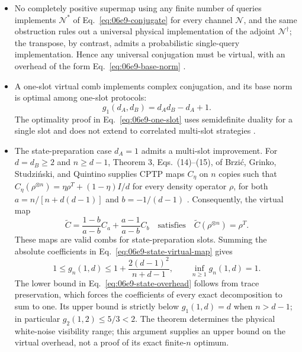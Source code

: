\begin{itemize}
  \item No completely positive supermap using any finite number of queries
  implements $\mathcal N^{*}$ of Eq.~\eqref{eq:06e9-conjugate} for every
  channel $\mathcal N$, and the same obstruction rules out a universal
  physical implementation of the adjoint $\mathcal N^{\dagger}$; the
  transpose, by contrast, admits a probabilistic single-query
  implementation.  Hence any universal conjugation must be virtual, with an
  overhead of the form Eq.~\eqref{eq:06e9-base-norm}
  .

  \item A one-slot virtual comb implements complex conjugation, and its
  base norm is optimal among one-slot protocols:
  \begin{equation}
    g_1(d_A,d_B)=d_Ad_B-d_A+1.
    \label{eq:06e9-one-slot}
  \end{equation}
  The optimality proof in Eq.~\eqref{eq:06e9-one-slot} uses semidefinite
  duality for a single slot and does not extend to correlated multi-slot
  strategies .

  \item The state-preparation case $d_A=1$ admits a multi-slot improvement.
For $d=d_B\geq2$ and $n\geq d-1$, Theorem 3, Eqs.~(14)--(15), of
Brzi\'c, Grinko, Studzi\'nski, and Quintino supplies CPTP maps
$C_\eta$ on $n$ copies such that
$C_\eta(\rho^{\otimes n})=\eta\rho^T+(1-\eta)I/d$ for every density
operator $\rho$, for both $a=n/[n+d(d-1)]$ and $b=-1/(d-1)$
.
Consequently, the virtual map
\begin{equation}
  \widetilde C=\frac{1-b}{a-b}C_a+\frac{a-1}{a-b}C_b
  \quad\text{satisfies}\quad
  \widetilde C(\rho^{\otimes n})=\rho^T.
  \label{eq:06e9-state-virtual-map}
\end{equation}
These maps are valid combs for state-preparation slots. Summing the absolute
coefficients in Eq.~\eqref{eq:06e9-state-virtual-map} gives
\begin{equation}
  1\leq g_n(1,d)\leq1+\frac{2(d-1)^2}{n+d-1},
  \qquad \inf_{n\geq1}g_n(1,d)=1.
  \label{eq:06e9-state-overhead}
\end{equation}
The lower bound in Eq.~\eqref{eq:06e9-state-overhead} follows from trace
preservation, which forces the coefficients of every exact decomposition
to sum to one. Its upper bound is strictly below $g_1(1,d)=d$ when
$n>d-1$; in particular $g_2(1,2)\leq5/3<2$.
The theorem determines the physical white-noise visibility range; this
argument supplies an upper bound on the virtual overhead, not a proof of
its exact finite-$n$ optimum.


\end{itemize}
